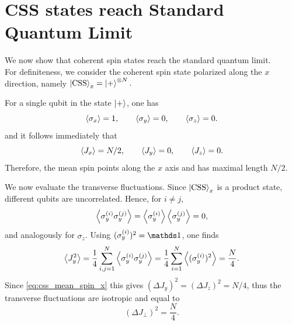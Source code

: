 \section*{CSS states reach Standard Quantum Limit}
\label{app:derivation_CSS_states_reach_SQL}
We now show that coherent spin states reach the standard quantum limit. 
\\
For definiteness, we consider the coherent spin state polarized along the \(x\) direction, namely $\ket{\mathrm{CSS}}_x
=
\ket{+}^{\otimes N}.$

For a single qubit in the state \(\ket{+}\), one has
\begin{equation}
	\expval{\sigma_x}=1,
	\qquad
	\expval{\sigma_y}=0,
	\qquad
	\expval{\sigma_z}=0.
	\label{eq:single_qubit_plus_expectations}
\end{equation}
and it follows immediately that
\begin{equation}
	\expval{J_x}=N/2,
	\qquad
	\expval{J_y}=0,
	\qquad
	\expval{J_z}=0.
	\label{eq:css_mean_spin_x}
\end{equation}
Therefore, the mean spin points along the \(x\) axis and has maximal length $N/2$.

We now evaluate the transverse fluctuations. Since \(\ket{\mathrm{CSS}}_x\) is a product state, different qubits are uncorrelated. Hence, for \(i\neq j\),
\begin{equation}
	\expval{\sigma_y^{(i)}\sigma_y^{(j)}}
	=
	\expval{\sigma_y^{(i)}}\expval{\sigma_y^{(j)}}=0,
	\label{eq:css_uncorrelated_cross_terms_y}
\end{equation}
and analogously for \(\sigma_z\). Using \((\sigma_y^{(i)})^2=\id\), one finds
\begin{equation}
	\expval{J_y^2}
	=
	\frac{1}{4}
	\sum_{i,j=1}^N
	\expval{\sigma_y^{(i)}\sigma_y^{(j)}}
	=
	\frac{1}{4}\sum_{i=1}^N \expval{(\sigma_y^{(i)})^2}
	=
	\frac{N}{4}.
	\label{eq:css_Jy2}
\end{equation}
Since \eqref{eq:css_mean_spin_x} this gives $(\Delta J_y)^2=(\Delta J_z)^2=N/4$, thus the transverse fluctuations are isotropic and equal to
\begin{equation}
	(\Delta J_\perp)^2=\frac{N}{4}.
	\label{eq:css_transverse_variance}
\end{equation}

